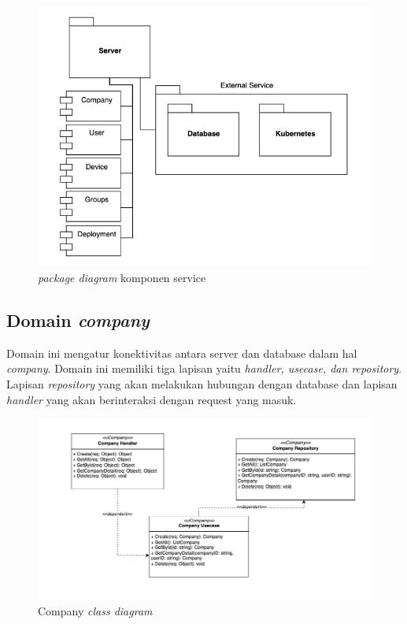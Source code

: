 \begin{figure}[ht]
  \centering
  \includegraphics[width=1\textwidth]{resources/chapter-3/package-backend-diagram.jpg}
  \caption{\textit{package diagram} komponen service}
  \label{fig:package-diagram-backend}
\end{figure}

\subsection{Domain \textit{company}}

Domain ini mengatur konektivitas antara server dan database dalam hal \textit{company}. Domain ini memiliki tiga lapisan yaitu \textit{handler, usecase, dan repository}. Lapisan \textit{repository} yang akan melakukan hubungan dengan database dan lapisan \textit{handler} yang akan berinteraksi dengan request yang masuk.

\begin{figure}[h]
  \centering
  \includegraphics[width=1\textwidth]{resources/chapter-3/class/company-class-diagram.jpg}
  \caption{Company \textit{class diagram}}
  \label{fig:company-class-diagram}
\end{figure}

